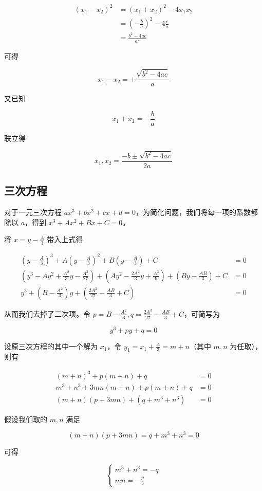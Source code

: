 \documentclass[hyperref,UTF8,12pt,a4paper]{ctexart}
\begin{document}
$$
\begin{aligned}
(x_1-x_2)^2&=(x_1+x_2)^2-4x_1x_2\\
&=(-\frac ba)^2-4\frac ca \\
&=\frac{b^2-4ac}{a^2}
\end{aligned}
$$

可得

$$
x_1-x_2=\pm\frac{\sqrt{b^2-4ac}}{a}
$$

又已知

$$
x_1+x_2=-\frac ba
$$

联立得

$$
x_1,x_2=\frac{-b\pm\sqrt{b^2-4ac}}{2a}
$$

\subsection{三次方程}

对于一元三次方程 $ax^3+bx^2+cx+d=0$，为简化问题，我们将每一项的系数都除以 $a$，得到 $x^3+Ax^2+Bx+C=0$。

将 $x=y-\frac A3$ 带入上式得

$$
\begin{aligned}
(y-\frac A3)^3+A(y-\frac A3)^2+B(y-\frac A3)+C&=0 \\
(y^3-Ay^2+\frac {A^2}3y-\frac {A^3}{27})+(Ay^2-\frac {2A^2}3y+\frac{A^3}9)+(By-\frac {AB}3)+C&=0\\
y^3+(B-\frac{A^2}3)y+(\frac{2A^3}{27}-\frac{AB}3+C)&=0
\end{aligned}
$$

从而我们去掉了二次项。令 $p=B-\frac{A^2}3,q=\frac{2A^3}{27}-\frac{AB}3+C$，可简写为

$$
y^3+py+q=0
$$

设原三次方程的其中一个解为 $x_1$，令 $y_1=x_1+\frac A3=m+n$（其中 $m,n$ 为任取），则有

$$
\begin{aligned}
(m+n)^3+p(m+n)+q&=0\\
m^3+n^3+3mn(m+n)+p(m+n)+q&=0\\
(m+n)(p+3mn)+(q+m^3+n^3)&=0
\end{aligned}
$$

假设我们取的 $m,n$ 满足

$$
(m+n)(p+3mn)=q+m^3+n^3=0
$$

可得

$$
\begin{cases}
m^3+n^3=-q \\
mn=-\frac p3
\end{cases}
$$
\end{document}
